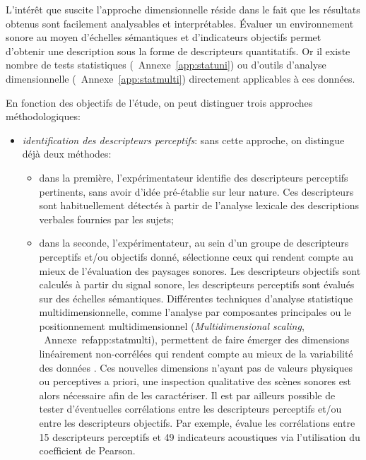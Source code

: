 L'intérêt que suscite l'approche dimensionnelle réside dans le fait que les résultats obtenus sont facilement analysables et interprétables. Évaluer un environnement sonore au moyen d'échelles sémantiques et d'indicateurs objectifs permet d'obtenir une description sous la forme de descripteurs quantitatifs. Or il existe nombre de tests statistiques (\cf~Annexe~\ref{app:statuni}) ou d'outils d'analyse dimensionnelle (\cf~Annexe~\ref{app:statmulti}) directement applicables à ces données.

En fonction des objectifs de l'étude, on peut distinguer trois approches méthodologiques:

\begin{itemize}

\item \emph{identification des descripteurs perceptifs}: sans cette approche, on distingue déjà deux méthodes:

\begin{itemize}
\item dans la première, l'expérimentateur identifie des descripteurs perceptifs pertinents, sans avoir d'idée pré-établie sur leur nature. Ces descripteurs sont habituellement détectés à partir de l'analyse lexicale des descriptions verbales fournies par les sujets;

\item dans la seconde, l'expérimentateur, au sein d'un groupe de descripteurs perceptifs et/ou objectifs donné, sélectionne ceux qui rendent compte au mieux de l'évaluation des paysages sonores. Les descripteurs objectifs sont calculés à partir du signal sonore, les descripteurs perceptifs sont évalués sur des échelles sémantiques. Différentes techniques d'analyse statistique multidimensionnelle, comme l'analyse par composantes principales ou le positionnement multidimensionnel (\emph{Multidimensional scaling}, \cf~Annexe~ref{app:statmulti}), permettent de faire émerger des dimensions linéairement non-corrélées qui rendent compte au mieux de la variabilité des données \citep{cain2013development,torija2013application}. Ces nouvelles dimensions n'ayant pas de valeurs physiques ou perceptives a priori, une inspection qualitative des scènes sonores est alors nécessaire afin de les caractériser. Il est par ailleurs possible de tester d'éventuelles corrélations entre les descripteurs perceptifs et/ou entre les descripteurs objectifs. Par exemple, \citep{torija2013application} évalue les corrélations entre 15 descripteurs perceptifs et 49 indicateurs acoustiques via l'utilisation du coefficient de Pearson.
\end{itemize}


\end{itemize}
